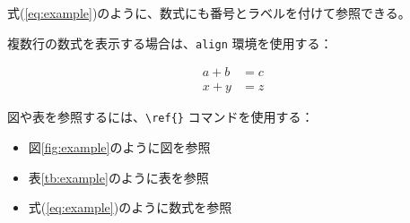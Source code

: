 式(\ref{eq:example})のように、数式にも番号とラベルを付けて参照できる。


複数行の数式を表示する場合は、\verb|align| 環境を使用する：

\begin{align}
  a + b &= c \\
  x + y &= z
\end{align}


図や表を参照するには、\verb|\ref{}| コマンドを使用する：

\begin{itemize}
  \item 図\ref{fig:example}のように図を参照
  \item 表\ref{tb:example}のように表を参照
  \item 式(\ref{eq:example})のように数式を参照
\end{itemize}
\fi